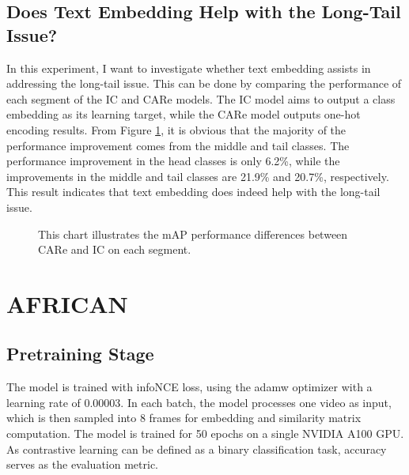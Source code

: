 \subsection{Does Text Embedding Help with the Long-Tail Issue?}
In this experiment, I want to investigate whether text embedding assists in addressing the long-tail issue. This can be done by comparing the performance of each segment of the IC and CARe models. The IC model aims to output a class embedding as its learning target, while the CARe model outputs one-hot encoding results. From Figure \ref{fig:tp_longtailcomp}, it is obvious that the majority of the performance improvement comes from the middle and tail classes. The performance improvement in the head classes is only 6.2\%, while the improvements in the middle and tail classes are 21.9\% and 20.7\%, respectively. This result indicates that text embedding does indeed help with the long-tail issue. 

\begin{figure}[ht]
    \centering
    \resizebox{1.0\textwidth}{!}{}
    \caption[mAP performance differences between CARe and IC on each segment]{This chart illustrates the mAP performance differences between CARe and IC on each segment.}
    \label{fig:tp_longtailcomp}
\end{figure}



\section{AFRICAN}
\subsection{Pretraining Stage}
The model is trained with infoNCE \parencite{oord2019representation} loss, using the adamw optimizer with a learning rate of 0.00003. In each batch, the model processes one video as input, which is then sampled into 8 frames for embedding and similarity matrix computation. The model is trained for 50 epochs on a single NVIDIA A100 GPU. As contrastive learning can be defined as a binary classification task, accuracy serves as the evaluation metric.

